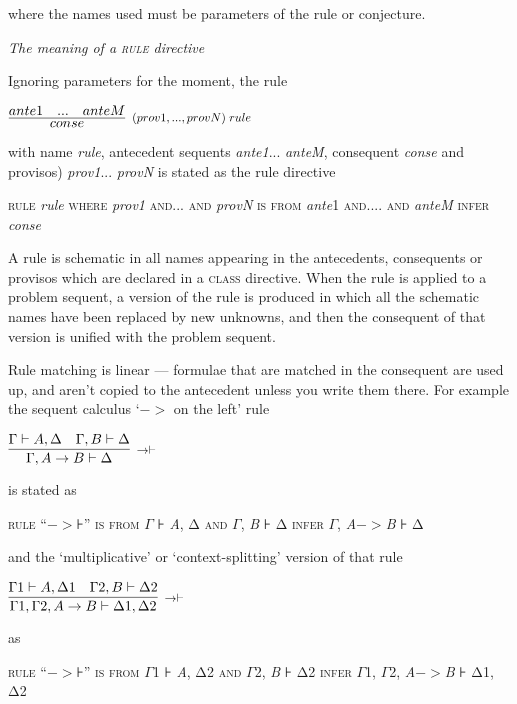 where the names used must be parameters of the rule or conjecture.


\textit{The meaning of a \textsc{rule} directive}


Ignoring parameters for the moment, the rule


$\infer[\reason{$(prov1,...,provN)\;rule$}]
       {conse}
       {ante1\quad ...\quad anteM}$

with name \textit{rule}, antecedent sequents \textit{ante1}... \textit{anteM}, consequent \textit{conse} and provisos) \textit{prov1}... \textit{provN} is stated as the rule directive


\textsc{rule} \textit{rule} \textsc{where} \textit{prov1} \textsc{and... and} \textit{provN} \textsc{is from} \textit{ante}1 \textsc{and.... and} \textit{anteM} \textsc{infer} \textit{conse}


A rule is schematic in all names appearing in the antecedents, consequents or provisos which are declared in a \textsc{class} directive. When the rule is applied to a problem sequent, a version of the rule is produced in which all the schematic names have been replaced by new unknowns, and then the consequent of that version is unified with the problem sequent.


Rule matching is linear --- formulae that are matched in the consequent are used up, and aren't copied to the antecedent unless you write them there. For example the sequent calculus `$->$ on the left' rule


$\infer[\reason{$->|- $}]
       {\Gamma,A->B |- \Delta }
       {\Gamma  |- A,\Delta \quad \Gamma,B |- \Delta }$

is stated as


\textsc{rule} ``$->$⊦'' \textsc{is from} \textsc{\ensuremath{\Gamma}} \textsc{⊦} \textit{A}, Δ \textsc{and} \textsc{\ensuremath{\Gamma}}\textsc{,} \textit{B} ⊦ Δ \textsc{infer} \textsc{\ensuremath{\Gamma}}, \textit{A}$->$\textit{B} ⊦ Δ


and the `multiplicative' or `context-splitting' version of that rule


$\infer[\reason{$->|- $}]
       {\Gamma 1,\Gamma 2,A->B |- \Delta 1,\Delta 2}
       {\Gamma 1 |- A,\Delta 1\quad \Gamma 2,B |- \Delta 2}$

as


\textsc{rule} ``$->$⊦'' \textsc{is from} \textsc{\ensuremath{\Gamma}1} \textsc{⊦} \textit{A}, Δ2 \textsc{and} \textsc{\ensuremath{\Gamma}2}\textsc{,} \textit{B} ⊦ Δ2 \textsc{infer} \textsc{\ensuremath{\Gamma}1, \ensuremath{\Gamma}2}, \textit{A}$->$\textit{B} ⊦ Δ1, Δ2


